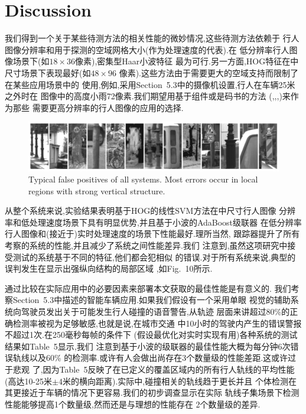 \documentclass[10pt,letterpaper,journal,compsoc]{IEEEtran}
\begin{document}
\section{Discussion}
我们得到一个关于某些待测方法的相关性能的微妙情况,这些待测方法依赖于
行人图像分辨率和用于探测的空域网格大小(作为处理速度的代表).在
低分辨率行人图像场景下(如$18\times36$像素),密集型Haar小波特征
最为可行.另一方面,HOG特征在中尺寸场景下表现最好($如48\times96$
像素).这些方法由于需要更大的空域支持而限制了在某些应用场景中的
使用,例如,采用Section~5.3中的摄像机设置,行人在车辆25米之外时在
图像中的高度小雨72像素.我们期望用基于组件或是码书的方法
(\cite{bib1},\cite{bib39},\cite{bib40},\cite{bib61})来作为那些
需要更高分辨率的行人图像的应用的选择.

\begin{figure}[!t]
\centering
\includegraphics[width=7in]{fig10.JPG}
\caption{Typical false positives of all systems. Most errors occur in local regions with strong vertical structure.
}
\end{figure}
从整个系统来说,实验结果表明基于HOG的线性SVM方法在中尺寸行人图像
分辨率和低处理速度场景下具有明显优势,并且基于小波的AdaBoost级联器
在低分辨率行人图像和(接近于)实时处理速度的场景下性能最好.理所当然,
跟踪器提升了所有考察的系统的性能,并且减少了系统之间性能差异.我们
注意到,虽然这项研究中接受测试的系统基于不同的特征,他们都会犯相似
的错误.对于所有系统来说,典型的误判发生在显示出强纵向结构的局部区域
,如Fig.~10所示.

通过比较在实际应用中的必要因素来部署本文获取的最佳性能是有意义的.
我们考察Section~5.3中描述的智能车辆应用.如果我们假设有一个采用单眼
视觉的辅助系统向驾驶员发出关于可能发生行人碰撞的语音警告,从轨迹
层面来讲超过80\%的正确检测率被视为足够敏感,也就是说,在城市交通
中10小时的驾驶内产生的错误警报不超过1次.在250毫秒每帧的条件下
(假设最优化对实时实现有用)各种系统的测试结果如Table~5显示,我们
注意到基于小波的级联器的最佳性能大概为每分钟6次错误轨线以及60\%
的检测率.或许有人会做出尚存在3个数量级的性能差距.这或许过于悲观
了,因为Table~5反映了在已定义的覆盖区域内的所有行人轨线的平均性能
(高达10-25米$\pm4$米的横向距离).实际中,碰撞相关的轨线趋于更长并且
个体检测在其更接近于车辆的情况下更容易.我们的初步调查显示在实际
轨线子集场景下检测性能能够提高1个数量级,然而还是与理想的性能存在
2个数量级的差异.
\end{document}
